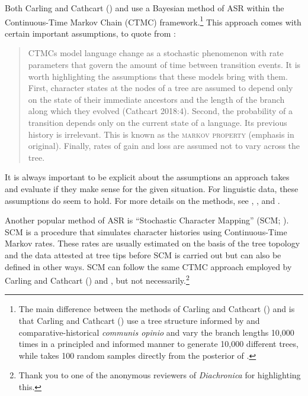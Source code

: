 \documentclass[12pt,letterpaper]{article}
\begin{document}
Both Carling and Cathcart (\citeyear{carling2021reconstructing}) and \citet{goldstein_2022} use a Bayesian method of ASR within the Continuous-Time Markov Chain (CTMC) framework.\footnote{The main difference between the methods of Carling and Cathcart (\citeyear{carling2021reconstructing}) and \citet{goldstein_2022} is that Carling and Cathcart (\citeyear{carling2021reconstructing}) use a tree structure informed by \citet{chang2015ancestry} and comparative-historical \textit{communis opinio} and vary the branch lengths 10,000 times in a principled and informed manner to generate 10,000 different trees, while \citet{goldstein_2022} takes 100 random samples directly from the posterior of \citet{chang2015ancestry}.} This approach comes with certain important assumptions, to quote from \citet[77]{goldstein_2022}:

\begin{quotation}
CTMCs model language change as a stochastic phenomenon with rate parameters that govern the amount of time between transition events. It is worth highlighting the assumptions that these models bring with them. First, character states at the nodes of a tree are assumed to depend only on the state of their immediate ancestors and the length of the branch along which they evolved (Cathcart 2018:4). Second, the probability of a transition depends only on the current state of a language. Its previous history is irrelevant. This is known as the \textsc{markov property} (emphasis in original). Finally, rates of gain and loss are assumed not to vary across the tree.
\end{quotation}

It is always important to be explicit about the assumptions an approach takes and evaluate if they make sense for the given situation. For linguistic data, these assumptions do seem to hold. For more details on the methods, see \citet{goldstein_2022}, \citet{pagel2004bayesian}, \citet{ronquist2004bayesian} and \citet{liggett2010continuous}. 

Another popular method of ASR is ``Stochastic Character Mapping'' (SCM; \citealt{huelsenbeck2003stochastic}). SCM is a procedure that simulates character histories using Continuous-Time Markov rates. These rates are usually estimated on the basis of the tree topology and the data attested at tree tips before SCM is carried out but can also be defined in other ways. SCM can follow the same CTMC approach employed by Carling and Cathcart (\citeyear{carling2021reconstructing}) and \citet{goldstein_2022}, but not necessarily.\footnote{Thank you to one of the anonymous reviewers of \textit{Diachronica} for highlighting this.}
\end{document}
